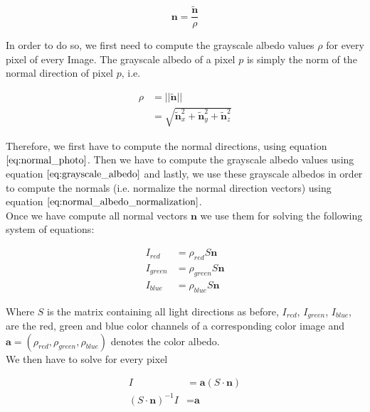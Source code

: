 \documentclass{paper}
\begin{document}
\begin{equation}
    \textbf{n} = \frac{\tilde{\textbf{n}}}{\rho} 
\label{eq:normal_albedo_normalization}
\end{equation}

In order to do so, we first need to compute the grayscale albedo values $\rho$ for every pixel of every Image. The grayscale albedo of a pixel $p$ is simply the norm of the normal direction of pixel $p$, i.e. 

\begin{align}
    \rho 
    &= ||\tilde{\textbf{n}} || \nonumber \\
    &= \sqrt{\tilde{\textbf{n}}_{x}^2 + \tilde{\textbf{n}}_{y}^2 + \tilde{\textbf{n}}_{z}^2}    
\label{eq:grayscale_albedo}
\end{align}

Therefore, we first have to compute the normal directions, using equation $\ref{eq:normal_photo}$. Then we have to compute the grayscale albedo values using equation $\ref{eq:grayscale_albedo}$ and lastly, we use these grayscale albedos in order to compute the normals (i.e. normalize the normal direction vectors) using equation $\ref{eq:normal_albedo_normalization}$. \\

Once we have compute all normal vectors $\textbf{n}$ we use them for solving the following system of equations:

\begin{align}
    I_{red} &= \rho_{red} S \textbf{n} \nonumber \\
    I_{green} &= \rho_{green} S \textbf{n} \nonumber \\
    I_{blue} &= \rho_{blue} S \textbf{n}
\label{eq:color_albedo_system}
\end{align}

Where $S$ is the matrix containing all light directions as before, $I_{red}$, $I_{green}$, $I_{blue}$, are the red, green and blue color channels of a corresponding color image and $\textbf{a} = (\rho_{red},\rho_{green},\rho_{blue})$ denotes the color albedo. \\

We then have to solve for every pixel

\begin{align}
    I &= \textbf{a}(S \cdot \textbf{n}) \nonumber \\
    (S \cdot \textbf{n})^{-1}I &= \textbf{a}
\label{eq:albedo_system1}
\end{align}
\end{document}
